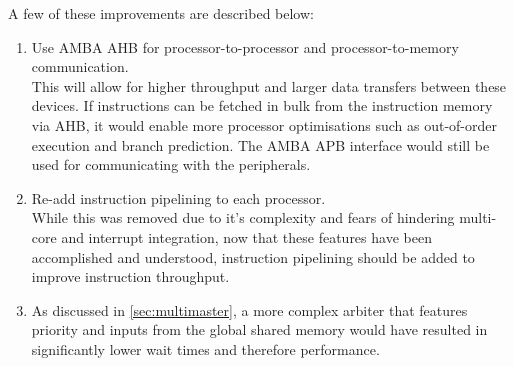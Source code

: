 A few of these improvements are described below:
\begin{enumerate}
\item Use AMBA AHB for processor-to-processor and processor-to-memory communication.\\
This will allow for higher throughput and larger data transfers between these devices. If instructions can be fetched in bulk from the instruction memory via AHB, it would enable more processor optimisations such as out-of-order execution and branch prediction. The AMBA APB interface would still be used for communicating with the peripherals.

\item Re-add instruction pipelining to each processor.\\While this was removed due to it's complexity and fears of hindering multi-core and interrupt integration, now that these features have been accomplished and understood, instruction pipelining should be added to improve instruction throughput.

\item As discussed in \cref{sec:multimaster}, a more complex arbiter that features priority and inputs from the global shared memory would have resulted in significantly lower wait times and therefore performance.
\end{enumerate}













